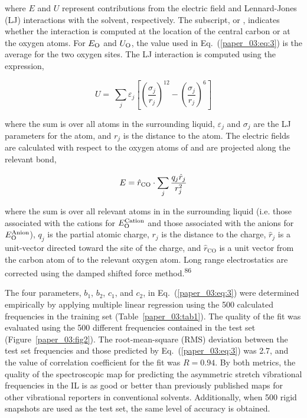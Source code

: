 where \(E\) and \(U\) represent contributions from the electric field and Lennard-Jones (LJ) interactions with the solvent, respectively. The subscript,  or , indicates whether the interaction is computed at the location of the  central carbon or at the oxygen atoms. For \(E_{\ce{O}}\) and \(U_{\ce{O}}\), the value used in Eq.~(\ref{paper_03:eq:3}) is the average for the two  oxygen sites. The LJ interaction is computed using the expression,

\begin{equation}
  \label{paper_03:eq:4}
  U = \ \sum_{j}^{}\varepsilon_{j}\left\lbrack \left( \frac{\sigma_{j}}{r_{j}} \right)^{12} - \left( \frac{\sigma_{j}}{r_{j}} \right)^{6} \right\rbrack
\end{equation}

where the sum is over all atoms in the surrounding liquid, \(\varepsilon_{j}\) and \(\sigma_{j}\) are the LJ parameters for the atom, and \(r_{j}\) is the distance to the atom. The electric fields are calculated with respect to the oxygen atoms of  and are projected along the relevant  bond,

\begin{equation}
  \label{paper_03:eq:5}
  E = {\hat{r}}_{\ce{CO}} \cdot \sum_{j}^{}\frac{q_{j}{\hat{r}}_{j}}{r_{j}^{2}}
\end{equation}

where the sum is over all relevant atoms in in the surrounding liquid (i.e. those associated with the cations for \(E_{\ce{O}}^{\text{Cation}}\) and those associated with the anions for \(E_{\ce{O}}^{\text{Anion}}\)), \(q_{j}\) is the partial atomic charge, \(r_{j}\) is the distance to the charge, \({\hat{r}}_{j}\) is a unit-vector directed toward the site of the charge, and \({\hat{r}}_{\mathrm{\text{CO}}}\) is a unit vector from the carbon atom of  to the relevant oxygen atom. Long range electrostatics are corrected using the damped shifted force method.\textsuperscript{86}

The four parameters, \(b_{1}\), \(b_{2}\), \(c_{1}\), and \(c_{2}\), in Eq.~(\ref{paper_03:eq:3}) were determined empirically by applying multiple linear regression using the \num{500} calculated frequencies in the training set (Table~\ref{paper_03:tab1}). The quality of the fit was evaluated using the \num{500} different frequencies contained in the test set (Figure~\ref{paper_03:fig2}). The root-mean-square (RMS) deviation between the test set frequencies and those predicted by Eq.~(\ref{paper_03:eq:3}) was \SI{2.7}{\wavenumber}, and the value of correlation coefficient for the fit was \(R = 0.94\). By both metrics, the quality of the spectroscopic map for predicting the  asymmetric stretch vibrational frequencies in the \ce{[C4C1im][PF6]} IL is as good or better than previously published maps for other vibrational reporters in conventional solvents. Additionally, when \num{500} rigid  snapshots are used as the test set, the same level of accuracy is obtained.

